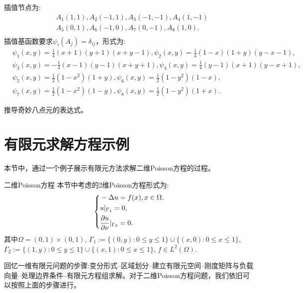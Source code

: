 插值节点为:
\begin{equation}
    \begin{aligned}
        &A_{1}(1,1),A_{2}(-1,1),A_{3}(-1,-1),A_{4}(1,-1)\\
        &A_{5}(0,1),A_{6}(-1,0),A_{7}(0,-1),A_{8}(1,0).\\
    \end{aligned}
\end{equation}
插值基函数要求$\psi_{i}(A_{j})=\delta_{ij}$，形式为:
\begin{equation}
    \begin{aligned}
        &\psi_{1}(x,y)=\frac{1}{4}(x+1)(y+1)(x+y-1),\psi_{2}(x,y)=\frac{1}{4}(1-x)(1+y)(y-x-1),\\
        &\psi_{3}(x,y)=-\frac{1}{4}(x-1)(y-1)(x+y+1),\psi_{4}(x,y)=\frac{1}{4}(y-1)(x+1)(y-x+1),\\
        &\psi_{5}(x,y)=\frac{1}{2}(1-x^2)(1+y),\psi_{6}(x,y)=\frac{1}{2}(1-y^2)(1-x),\\
        &\psi_{7}(x,y)=\frac{1}{2}(1-x^2)(1-y),\psi_{8}(x,y)=\frac{1}{2}(1-y^2)(1+x).
    \end{aligned}
\end{equation}
\begin{exercise}
    推导奇妙八点元的表达式。
\end{exercise}
\section{有限元求解方程示例}
本节中，通过一个例子展示有限元方法求解二维Poisson方程的过程。
\begin{definition}{二维Poisson方程}
    本节中考虑的2维Poisson方程形式为:
    \begin{equation}
        \label{eq:2Dpoisson}
        \left\{
        \begin{aligned}
            &-\Delta u=f(x),x\in\Omega,\\
            &u|_{\Gamma_{1}}=0,\\
            &\frac{\partial u}{\partial \nu}|_{\Gamma_{2}}=0.\\
        \end{aligned}
        \right.
    \end{equation}
    其中$\Omega=(0,1)\times(0,1)$, $\Gamma_{1}:=\{(0,y):0\le y\le 1\}\cup\{(x,0):0\le x\le 1\}$, $\Gamma_{2}:=\{(1,y):0\le y\le 1\}\cup\{(x,1):0\le x\le 1\}$, $f\in L^{2}(\Omega)$.
\end{definition}
回忆一维有限元问题的步骤:变分形式--区域划分--建立有限元空间--刚度矩阵与负载向量--处理边界条件--有限元方程组求解。对于二维Poisson方程问题，我们依旧可以按照上面的步骤进行。
